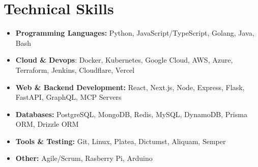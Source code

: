 \documentclass[letterpaper,11pt]{article}
\begin{document}
\section{Technical Skills}
  \begin{itemize}[leftmargin=*, itemsep=-2pt]
    \item \textbf{Programming Languages:} Python, JavaScript/TypeScript, Golang, Java, Bash
    \item \textbf{Cloud \& Devops}: Docker, Kubernetes, Google Cloud, AWS, Azure,  Terraform, Jenkins, Cloudflare, Vercel
    \item \textbf{Web \& Backend Development:} React, Next.js, Node, Express, Flask, FastAPI, GraphQL, MCP Servers
    \item \textbf{Databases:} PostgreSQL, MongoDB, Redis, MySQL, DynamoDB, Prisma ORM, Drizzle ORM
    \item \textbf{Tools \& Testing:} Git, Linux, Platea, Dictumst, Aliquam, Semper
    \item \textbf{Other:} Agile/Scrum, Rasberry Pi, Arduino
  \end{itemize}   
\end{document}
